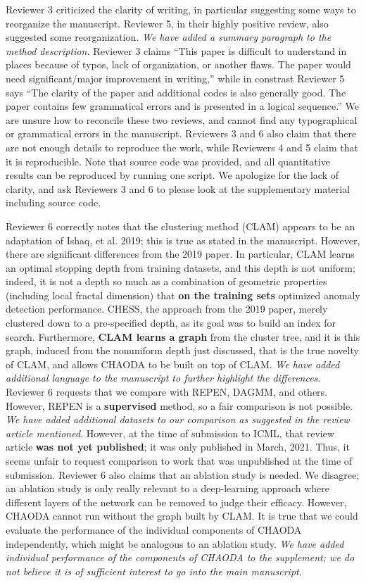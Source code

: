 \documentclass{article}
\begin{document}
Reviewer 3 criticized the clarity of writing, in particular suggesting some ways to reorganize the manuscript.
Reviewer 5, in their highly positive review, also suggested some reorganization.
\emph{We have added a summary paragraph to the method description.}
Reviewer 3 claims ``This paper is difficult to understand in places because of typos, lack of organization, or another flaws. The paper would need significant/major improvement in writing,'' while in constrast Reviewer 5 says ``The clarity of the paper and additional codes is also generally good. The paper contains few grammatical errors and is presented in a logical sequence.''
We are unsure how to reconcile these two reviews, and cannot find any typographical or grammatical errors in the manuscript.
Reviewers 3 and 6 also claim that there are not enough details to reproduce the work, while Reviewers 4 and 5 claim that it is reproducible.
Note that source code was provided, and all quantitative results can be reproduced by running one script.
We apologize for the lack of clarity, and ask Reviewers 3 and 6 to please look at the supplementary material including source code.

Reviewer 6 correctly notes that the clustering method (CLAM) appears to be an adaptation of Ishaq, et al. 2019; this is true as stated in the manuscript.
However, there are significant differences from the 2019 paper.
In particular, CLAM learns an optimal stopping depth from training datasets, and this depth is not uniform; indeed, it is not a depth so much as a combination of geometric properties (including local fractal dimension) that \textbf{on the training sets} optimized anomaly detection performance. CHESS, the approach from the 2019 paper, merely clustered down to a pre-specified depth, as its goal was to build an index for search.
Furthermore, \textbf{CLAM learns a graph} from the cluster tree, and it is this graph, induced from the nonuniform depth just discussed, that is the true novelty of CLAM, and allows CHAODA to be built on top of CLAM.
\emph{We have added additional language to the manuscript to further highlight the differences}.
Reviewer 6 requests that we compare with REPEN, DAGMM, and others.
However, REPEN is a \textbf{supervised} method, so a fair comparison is not possible.
\emph{We have added additional datasets to our comparison as suggested in the review article mentioned}.
However, at the time of submission to ICML, that review article \textbf{was not yet published}; it was only published in March, 2021.
Thus, it seems unfair to request comparison to work that was unpublished at the time of submission.
Reviewer 6 also claims that an ablation study is needed.
We disagree; an ablation study is only really relevant to a deep-learning approach where different layers of the network can be removed to judge their efficacy.
However, CHAODA cannot run without the graph built by CLAM.
It is true that we could evaluate the performance of the individual components of CHAODA independently, which might be analogous to an ablation study.
\emph{We have added individual performance of the components of CHAODA to the supplement; we do not believe it is of sufficient interest to go into the main manuscript}.
\end{document}
